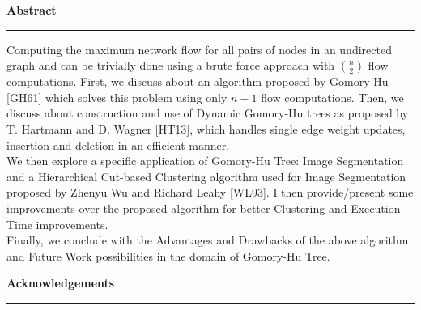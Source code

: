 \begin{titlepage}
    
    \begin{center}
    {\LARGE \bfseries Abstract}
    \end{center}
    \vspace{-7mm}
    {\centering
        \rule{0.9\textwidth}{1pt}
    \par}
    \vspace{7mm}
    
    \begin{center}
    \begin{minipage}{0.9\textwidth}

    \large{
    Computing the maximum network flow for all pairs of nodes in an undirected graph and can be trivially done using a brute force approach with $\binom{n}{2}$ flow computations. First, we discuss about an algorithm proposed by Gomory-Hu [GH61] which solves this problem using only $n-1$ flow computations. Then, we discuss about construction and use of Dynamic Gomory-Hu trees as proposed by T. Hartmann and D. Wagner [HT13], which handles single edge weight updates, insertion and deletion in an efficient manner. \\
    We then explore a specific application of Gomory-Hu Tree: Image Segmentation and a Hierarchical Cut-based Clustering algorithm used for Image Segmentation proposed by Zhenyu Wu and Richard Leahy [WL93]. I then provide/present some improvements over the proposed algorithm for better Clustering and Execution Time improvements. \\
    Finally, we conclude with the Advantages and Drawbacks of the above algorithm and Future Work possibilities in the domain of Gomory-Hu Tree.
    }
    \end{minipage}
    \end{center}


    \vspace*{3cm}
    \begin{center}
    {\LARGE \bfseries Acknowledgements}
    \end{center}
    \vspace{-7mm}
    {\centering
        \rule{0.9\textwidth}{1pt}
    \par}
    \vspace{7mm}
    
    \begin{center}
    \begin{minipage}{0.9\textwidth}


\end{minipage}
\end{center}
\end{titlepage}
